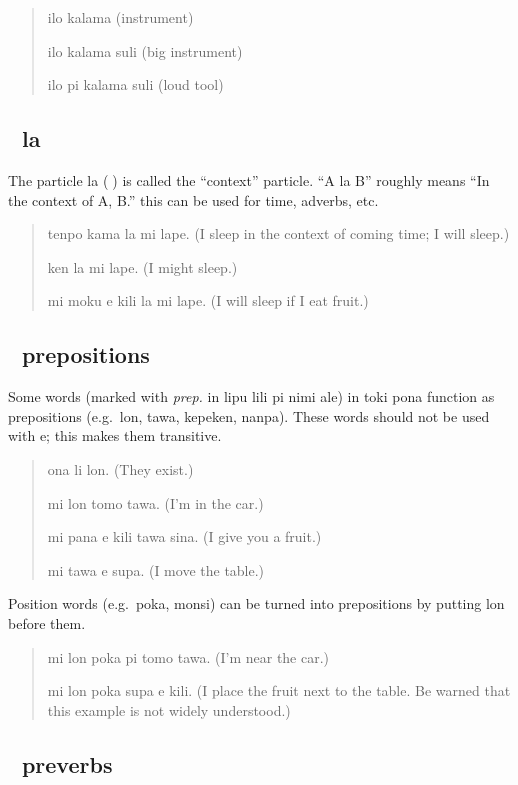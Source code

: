 \documentclass[statementpaper,oneside,article,14pt]{memoir}
\begin{document}
\begin{quote}
  ilo kalama (instrument)

  ilo kalama suli (big instrument)

  ilo pi kalama suli (loud tool)
\end{quote}
\subsection{{\sitpon󱤡} la}

\noindent The particle la ({\sitpon󱤡}) is called the ``context'' particle. 
``A la B'' roughly means ``In the context of A, B.'' this can be used for time, adverbs, etc.

\begin{quote}
  tenpo kama la mi lape. (I sleep in the context of coming time; I will sleep.)

  ken la mi lape. (I might sleep.)

  mi moku e kili la mi lape. (I will sleep if I eat fruit.)
\end{quote}

\subsection{{\sitpon󱤬} prepositions}

\noindent Some words (marked with \textit{prep.} in lipu lili pi nimi ale) in toki pona 
function as prepositions (e.g.\ lon, tawa, kepeken, nanpa). These words
should not be used with e; this makes them transitive.

\begin{quote}
  ona li lon. (They exist.)

  mi lon tomo tawa. (I'm in the car.)

  mi pana e kili tawa sina. (I give you a fruit.)

  mi tawa e supa. (I move the table.)
\end{quote}

\noindent Position words (e.g.\ poka, monsi) can be turned into prepositions by putting lon before them.

\begin{quote}
  mi lon poka pi tomo tawa. (I'm near the car.)

  mi lon poka supa e kili. (I place the fruit next to the table. Be warned that this example is not widely understood.)
\end{quote}

\subsection{{\sitpon󱥷} preverbs}
\end{document}
